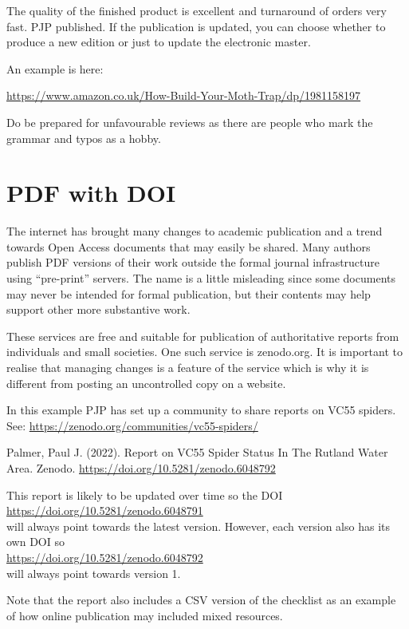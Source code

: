 \documentclass{article}
\begin{document}
The quality of the finished product is excellent and turnaround of orders very fast. PJP published. If the publication is updated, you can choose whether to produce a new edition or just to update the electronic master.

An example  is here:

\url{https://www.amazon.co.uk/How-Build-Your-Moth-Trap/dp/1981158197}

Do be prepared for unfavourable reviews as there are people who mark the grammar and typos as a hobby.

\section{PDF with DOI}

The internet has brought many changes to academic publication and a trend towards Open Access documents that may easily be shared. Many authors publish PDF versions of their work outside the formal journal infrastructure using \enquote{pre-print} servers. The name is a little misleading since some documents may never be intended for formal publication, but their contents may help support other more substantive work.

These services are free and suitable for publication of authoritative reports from individuals and small societies. One such service is zenodo.org.  It is important to realise that managing changes is a feature of the service which is why it is different from posting an uncontrolled copy on a website. 

In this example PJP has set up a community to share reports on VC55 spiders. \\
See: \url{https://zenodo.org/communities/vc55-spiders/} 

Palmer, Paul J. (2022). Report on VC55 Spider Status In The Rutland Water Area. Zenodo. \url{https://doi.org/10.5281/zenodo.6048792}

This report is likely to be updated over time so the DOI \\ \url{https://doi.org/10.5281/zenodo.6048791} \\will always point towards the latest version. However, each version also has its own DOI so \\
\url{https://doi.org/10.5281/zenodo.6048792} \\
 will always point towards version 1.
 
 
 Note that the report also includes a CSV version of the checklist as an example of how online publication may included mixed resources.
\end{document}
